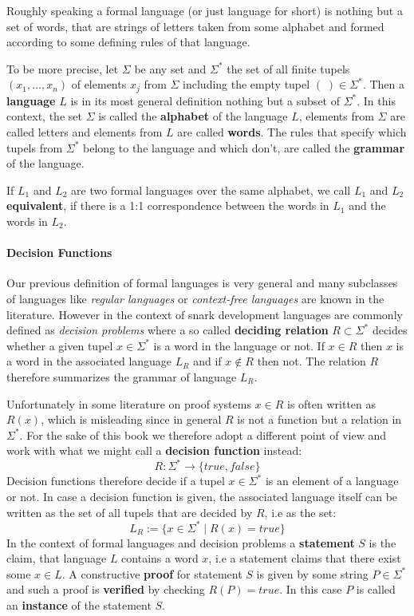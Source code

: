 Roughly speaking a formal language (or just language for short) is nothing but a set of words, that are strings of letters taken from some alphabet and formed according to some defining rules of that language. 

To be more precise, let $\Sigma$ be any set and $\Sigma^*$ the set of all finite tupels $(x_1,\ldots,x_n)$ of elements $x_j$ from $\Sigma$ including the empty tupel $(\;)\in \Sigma^*$. Then a \textbf{language} $L$ is in its most general definition nothing but a subset of $\Sigma^*$. In this context, the set $\Sigma$ is called the \textbf{alphabet} of the language $L$, elements from $\Sigma$ are called letters and elements from $L$ are called \textbf{words}. The rules that specify which tupels from $\Sigma^*$ belong to the language and which don't, are called the \textbf{grammar} of the language. 

If $L_1$ and $L_2$ are two formal languages over the same alphabet, we call $L_1$ and $L_2$ \textbf{equivalent}, if there is a 1:1 correspondence between the words in $L_1$ and the words in $L_2$.

\paragraph{Decision Functions} Our previous definition of formal languages is very general and many subclasses of languages like \textit{regular languages} or \textit{context-free languages} are known in the literature. However in the context of snark development languages are commonly defined as \textit{decision problems} where a so called \textbf{deciding relation} $R\subset \Sigma^*$ decides whether a given tupel $x\in \Sigma^*$ is a word in the language or not. If $x\in R$ then $x$ is a word in the associated language $L_R$ and if $x\notin R$ then not. The relation $R$ therefore summarizes the grammar of language $L_R$.

Unfortunately in some literature on proof systems $x\in R$ is often written as $R(x)$, which is  misleading since in general $R$ is not a function but a relation in $\Sigma^*$. For the sake of this book we therefore adopt a different point of view and work with what we might call a \textbf{decision function} instead:
\begin{equation}
R: \Sigma^* \to \{true, false\}
\end{equation}
Decision functions therefore decide if a tupel $x\in \Sigma^*$ is an element of a language or not. In case a decision function is given, the associated language itself can be written as the set of all tupels that are decided by $R$, i.e as the set:
\begin{equation}
L_R := \{x\in \Sigma^*\;|\; R(x)=true\}
\end{equation}
In the context of formal languages and decision problems a \textbf{statement} $S$ is the claim, that language $L$ contains a word $x$, i.e a statement claims that there exist some $x\in L$. A constructive \textbf{proof} for statement $S$ is given by some string $P\in \Sigma^*$ and such a proof is \textbf{verified} by checking $R(P)=true$. In this case $P$ is called an \textbf{instance} of the statement $S$.

